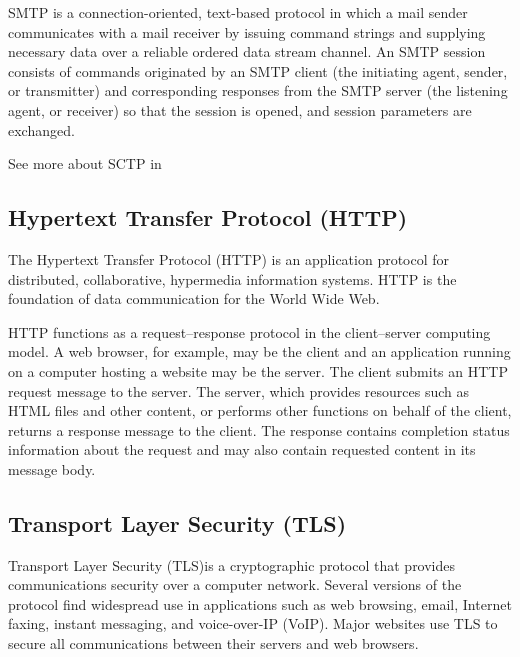 SMTP is a connection-oriented, text-based protocol in which a mail sender communicates with a mail receiver by issuing command strings and supplying necessary data over a reliable ordered data stream channel. An SMTP session consists of commands originated by an SMTP client (the initiating agent, sender, or transmitter) and corresponding responses from the SMTP server (the listening agent, or receiver) so that the session is opened, and session parameters are exchanged.

See more about SCTP in \cite{SMTP}

\subsection{Hypertext Transfer Protocol (HTTP)} 
The Hypertext Transfer Protocol (HTTP) is an application protocol for distributed, collaborative, hypermedia information systems. HTTP is the foundation of data communication for the World Wide Web.

HTTP functions as a request–response protocol in the client–server computing model. A web browser, for example, may be the client and an application running on a computer hosting a website may be the server. The client submits an HTTP request message to the server. The server, which provides resources such as HTML files and other content, or performs other functions on behalf of the client, returns a response message to the client. The response contains completion status information about the request and may also contain requested content in its message body.

\subsection{Transport Layer Security (TLS)} 
Transport Layer Security (TLS)is a cryptographic protocol that provides communications security over a computer network. Several versions of the protocol find widespread use in applications such as web browsing, email, Internet faxing, instant messaging, and voice-over-IP (VoIP). Major websites use TLS to secure all communications between their servers and web browsers.

